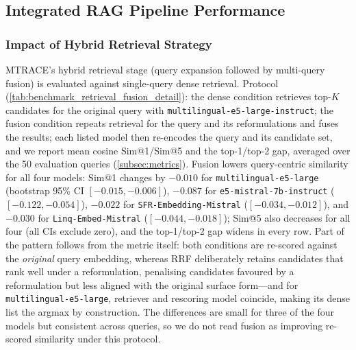 \documentclass[11pt]{article}
\begin{document}
\begin{table}[t]
    \centering
    \caption{Clustering diagnostics of the vector space.}
    \label{tab:embed-cluster}
\end{table}

\subsection{Integrated RAG Pipeline Performance}
\label{subsec:exp_e2e}

\subsubsection{Impact of Hybrid Retrieval Strategy}
MTRACE's hybrid retrieval stage (query expansion followed by multi-query fusion) is evaluated against single-query dense retrieval. Protocol (\cref{tab:benchmark_retrieval_fusion_detail}): the dense condition retrieves top-\(K\) candidates for the original query with \texttt{multilingual-e5-large-instruct}; the fusion condition repeats retrieval for the query and its reformulations and fuses the results; each listed model then re-encodes the query and its candidate set, and we report mean cosine Sim@1/Sim@5 and the top-1/top-2 gap, averaged over the 50 evaluation queries (\cref{subsec:metrics}). Fusion lowers query-centric similarity for all four models: Sim@1 changes by \(-0.010\) for \texttt{multilingual-e5-large} (bootstrap 95\% CI \([-0.015,-0.006]\)), \(-0.087\) for \texttt{e5-mistral-7b-instruct} (\([-0.122,-0.054]\)), \(-0.022\) for \texttt{SFR-Embedding-Mistral} (\([-0.034,-0.012]\)), and \(-0.030\) for \texttt{Linq-Embed-Mistral} (\([-0.044,-0.018]\)); Sim@5 also decreases for all four (all CIs exclude zero), and the top-1/top-2 gap widens in every row. Part of the pattern follows from the metric itself: both conditions are re-scored against the \emph{original} query embedding, whereas RRF deliberately retains candidates that rank well under a reformulation, penalising candidates favoured by a reformulation but less aligned with the original surface form---and for \texttt{multilingual-e5-large}, retriever and rescoring model coincide, making its dense list the argmax by construction. The differences are small for three of the four models but consistent across queries, so we do not read fusion as improving re-scored similarity under this protocol.
\end{document}
